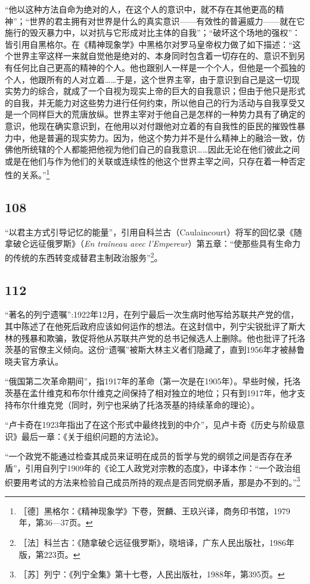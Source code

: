 \documentclass[fontset=fandol, a4paper, 12pt, openright]{ctexbook}
\begin{document}
“他以这种方法自命为绝对的人，在这个人的意识中，就不存在其他更高的精神”；“世界的君主拥有对世界是什么的真实意识——有效性的普遍威力——就在它施行的毁灭暴力中，以对抗与它形成对比主体的自我”；“破坏这个场地的强权”：皆引用自黑格尔。在《精神现象学》中黑格尔对罗马皇帝权力做了如下描述：“这个世界主宰这样一来就自觉他是绝对的、本身同时包含着一切存在的、意识不到另有任何比自己更高的精神的个人。他也跟别人一样是一个个人，但他是一个孤独的个人，他跟所有的人对立着……于是，这个世界主宰，由于意识到自己是这一切现实势力的综合，就成了一个自视为现实上帝的巨大的自我意识；但由于他只是形式的自我，并无能力对这些势力进行任何约束，所以他自己的行为活动与自我享受又是一个同样巨大的荒唐放纵。世界主宰对于他自己是怎样的一种势力具有了确定的意识，他现在确实意识到，在他用以对付跟他对立着的有自我性的臣民的摧毁性暴力中，他是普遍的现实势力。因为，他这个势力并不是什么精神上的融洽一致，仿佛他所统辖的个人都能把他视为他们自己的自我意识……因此无论在他们彼此之间或是在他们与作为他们的关联或连续性的他这个世界主宰之间，只存在着一种否定性的关系。”\footnote{［德］黑格尔：《精神现象学》下卷，贺麟、王玖兴译，商务印书馆，1979年，第36—37页。}

\subsection*{108}
“以君主方式引导记忆的能量”，引用自科兰古（Caulaincourt）将军的回忆录《随拿破仑远征俄罗斯》（\textit{En traîneau avec l'Empereur}）第五章：“使那些具有生命力的传统的东西转变成替君主制政治服务”\footnote{［法］科兰古：《随拿破仑远征俄罗斯》，晓培译，广东人民出版社，1986年版，第223页。}。

\subsection*{112}
“著名的列宁遗嘱”:1922年12月，在列宁最后一次生病时他写给苏联共产党的信，其中陈述了在他死后政府应该如何运作的想法。在这封信中，列宁尖锐批评了斯大林的残暴和欺骗，敦促将他从苏联共产党的总书记候选人上删除。他也批评了托洛茨基的官僚主义倾向。这份“遗嘱”被斯大林主义者们隐藏了，直到1956年才被赫鲁晓夫官方承认。

“俄国第二次革命期间”，指1917年的革命（第一次是在1905年）。早些时候，托洛茨基在孟什维克和布尔什维克之间保持了相对独立的地位；只有到1917年，他才支持布尔什维克党（同时，列宁也采纳了托洛茨基的持续革命的理论）。

“卢卡奇在1923年指出了在这个形式中最终找到的中介”，见卢卡奇《历史与阶级意识》最后一章：《关于组织问题的方法论》。

“一个政党不能通过检查其成员来证明在成员的哲学与党的纲领之间是否存在矛盾”，引用自列宁1909年的《论工人政党对宗教的态度》，中译本作：“一个政治组织要用考试的方法来检验自己成员所持的观点是否同党纲矛盾，那是办不到的。”\footnote{［苏］列宁：《列宁全集》第十七卷，人民出版社，1988年，第395页。}
\end{document}
